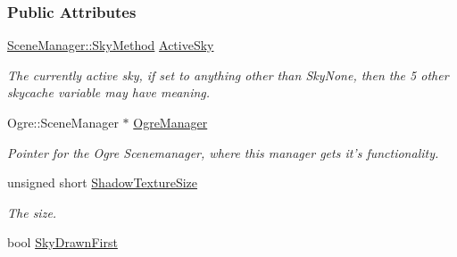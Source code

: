 \subsubsection*{Public Attributes}
\begin{DoxyCompactItemize}
\item 
\hypertarget{classphys_1_1internal_1_1SceneManagerData_a1106e747889ca1b177c33dbe1ea9f775}{
\hyperlink{classphys_1_1SceneManager_a91dd086aabaab926d070c65fc14828d6}{SceneManager::SkyMethod} \hyperlink{classphys_1_1internal_1_1SceneManagerData_a1106e747889ca1b177c33dbe1ea9f775}{ActiveSky}}
\label{classphys_1_1internal_1_1SceneManagerData_a1106e747889ca1b177c33dbe1ea9f775}

\begin{DoxyCompactList}\small\item\em The currently active sky, if set to anything other than SkyNone, then the 5 other skycache variable may have meaning. \item\end{DoxyCompactList}\item 
\hypertarget{classphys_1_1internal_1_1SceneManagerData_a685cc93f5a9070ae7d78f6eaa62db00a}{
Ogre::SceneManager $\ast$ \hyperlink{classphys_1_1internal_1_1SceneManagerData_a685cc93f5a9070ae7d78f6eaa62db00a}{OgreManager}}
\label{classphys_1_1internal_1_1SceneManagerData_a685cc93f5a9070ae7d78f6eaa62db00a}

\begin{DoxyCompactList}\small\item\em Pointer for the Ogre Scenemanager, where this manager gets it's functionality. \item\end{DoxyCompactList}\item 
\hypertarget{classphys_1_1internal_1_1SceneManagerData_a6564afc7255e32e9211568aab4a561f2}{
unsigned short \hyperlink{classphys_1_1internal_1_1SceneManagerData_a6564afc7255e32e9211568aab4a561f2}{ShadowTextureSize}}
\label{classphys_1_1internal_1_1SceneManagerData_a6564afc7255e32e9211568aab4a561f2}

\begin{DoxyCompactList}\small\item\em The size. \item\end{DoxyCompactList}\item 
\hypertarget{classphys_1_1internal_1_1SceneManagerData_a26e836bd8dd96a85ff9a9dac53a4a16d}{
bool \hyperlink{classphys_1_1internal_1_1SceneManagerData_a26e836bd8dd96a85ff9a9dac53a4a16d}{SkyDrawnFirst}}
\label{classphys_1_1internal_1_1SceneManagerData_a26e836bd8dd96a85ff9a9dac53a4a16d}


\end{DoxyCompactItemize}
